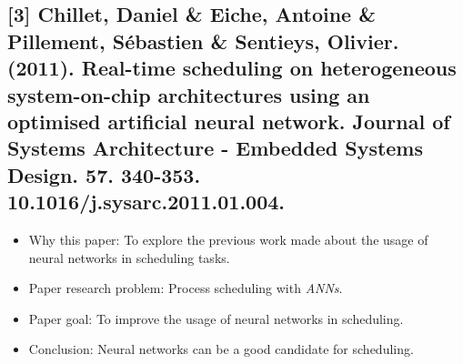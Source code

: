 \documentclass[twocolumn,11pt]{IEEEtran}
\begin{document}
    \subsection*{[3] Chillet, Daniel \& Eiche, Antoine \& Pillement, Sébastien \& Sentieys, Olivier. (2011). Real-time scheduling on heterogeneous system-on-chip architectures using an optimised artificial neural network. Journal of Systems Architecture - Embedded Systems Design. 57. 340-353. 10.1016/j.sysarc.2011.01.004.}
    \begin{itemize}
        \item Why this paper: To explore the previous work made about the usage of neural networks in scheduling tasks.
        \item Paper research problem: Process scheduling with \emph{ANNs}.
        \item Paper goal: To improve the usage of neural networks in scheduling.
        \item Conclusion: Neural networks can be a good candidate for scheduling.
    \end{itemize} 
\end{document}
